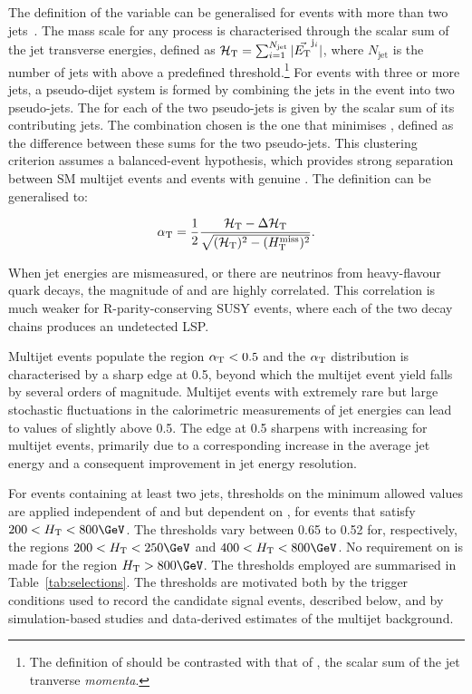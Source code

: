 The definition of the \alphat variable can be generalised for events
with more than two jets~\cite{RA1Paper}. The mass scale for any
process is characterised through the scalar sum of the jet transverse
energies, defined as $\scalst = \sum_{i=1}^{N_\text{jet}}
|\vec{\Et}^{\mathrm{j}_i}|$, where $N_\text{jet}$ is the number of
jets with \Et above a predefined threshold.\footnote{The definition of
  \scalst should be contrasted with that of \scalht, the scalar sum of
  the jet tranverse {\it momenta}. }
For events with three or more jets, a pseudo-dijet system is formed by
combining the jets in the event into two pseudo-jets. The \scalst for
each of the two pseudo-jets is given by the scalar \Et sum of its
contributing jets. The combination chosen is the one that minimises
\dst, defined as the difference between these sums for the two
pseudo-jets.  This clustering criterion assumes a balanced-event
hypothesis, which provides strong separation between SM multijet
events and events with genuine \ptvecmiss. The \alphat definition can
be generalised to:

\begin{equation}
  \label{eq:alphat}
  \alphat = \frac{1}{2} \frac{\scalst -
    \dst}{\sqrt{(\scalst)^2 - (\HTmiss)^2}}.
\end{equation}

When jet energies are mismeasured, or there are neutrinos from
heavy-flavour quark decays, the magnitude of \HTmiss and \dst are
highly correlated. This correlation is much weaker for
R-parity-conserving SUSY events, where each of the two decay chains
produces an undetected LSP.

Multijet events populate the region $\alphat< 0.5$ and the $\alphat$
distribution is characterised by a sharp edge at 0.5, beyond which the
multijet event yield falls by several orders of magnitude. Multijet
events with extremely rare but large stochastic fluctuations in the
calorimetric measurements of jet energies can lead to values of
\alphat slightly above 0.5. The edge at 0.5 sharpens with increasing
\scalht for multijet events, primarily due to a corresponding increase
in the average jet energy and a consequent improvement in jet energy
resolution. 

For events containing at least two jets, thresholds on the minimum
allowed \alphat values are applied independent of \njet and \nb but
dependent on \scalht, for events that satisfy $200 < \scalht <
800\GeV$. The \alphat thresholds vary between 0.65 to 0.52 for,
respectively, the regions $200 < \scalht < 250\GeV$ and $400 < \scalht
< 800\GeV$. No requirement on \alphat is made for the region $\scalht
> 800\GeV$. The thresholds employed are summarised in
Table~\ref{tab:selections}. The \alphat thresholds are motivated both
by the trigger conditions used to record the candidate signal events,
described below, and by simulation-based studies and data-derived
estimates of the multijet background. 

